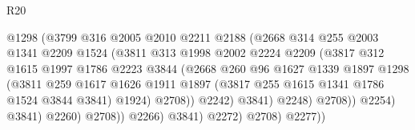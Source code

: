 \begin{lexlean}{R20}
\begin{coremodule}
                                    @1298
                                    (@3799
                                      @316
                                      @2005
                                      @2010
                                      @2211
                                      @2188
                                      (@2668
                                        @314
                                        @255
                                        @2003
                                        @1341
                                        @2209
                                        @1524
                                        (@3811
                                          @313
                                          @1998
                                          @2002
                                          @2224
                                          @2209
                                          (@3817
                                            @312
                                            @1615
                                            @1997
                                            @1786
                                            @2223
                                            @3844
                                            (@2668
                                              @260
                                              @96
                                              @1627
                                              @1339
                                              @1897
                                              @1298
                                              (@3811
                                                @259
                                                @1617
                                                @1626
                                                @1911
                                                @1897
                                                (@3817 @255 @1615 @1341 @1786 @1524 @3844 @3841)
                                                @1924)
                                              @2708))
                                          @2242)
                                        @3841)
                                      @2248)
                                    @2708))
                                @2254)
                              @3841)
                            @2260)
                          @2708))
                      @2266)
                    @3841)
                  @2272)
                @2708)
              @2277))

\end{coremodule}
\end{lexlean}
